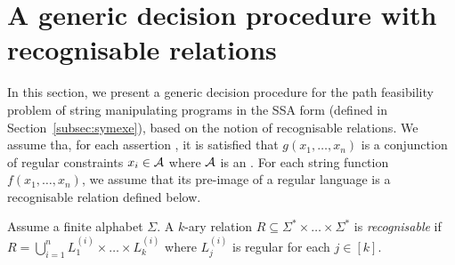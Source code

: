 

\section{A generic decision procedure with recognisable relations} \label{sec:algo}

In this section,  we present a generic decision procedure for the path feasibility problem %
of string manipulating programs in the SSA form (defined in Section~\ref{subsec:symexe}), 
based on the notion of recognisable relations. We assume tha, for each assertion , it is satisfied that $g(x_1,\ldots,x_n)$ is a conjunction of regular constraints
 $x_i \in \mathcal{A}$ where $\mathcal{A}$ is an \FA{}.   
%
%
For each string function $f(x_1,\ldots,x_n)$, we assume that its pre-image of a regular language is a recognisable relation defined below.  

\begin{definition}
	Assume a finite alphabet $\Sigma$. A $k$-ary relation $R\subseteq \Sigma^*\times \ldots\times \Sigma^*$ is \emph{recognisable}  if $R=\bigcup_{i=1}^n L^{(i)}_1\times \ldots\times L^{(i)}_k$ where $L^{(i)}_j$ is regular for each $j\in [k]$.
%
\end{definition}


